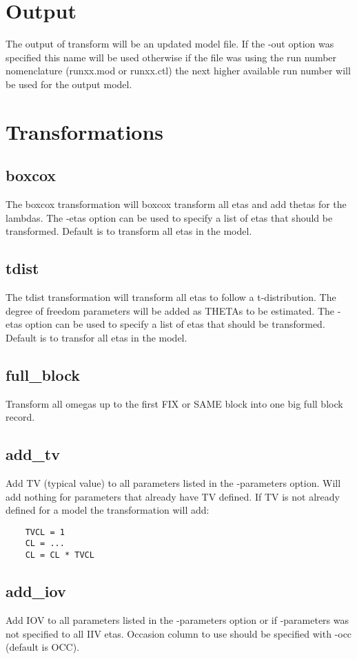 \section{Output}

The output of transform will be an updated model file. If the -out option was specified this name will be used otherwise if the file was using the run number nomenclature (runxx.mod or runxx.ctl) the next higher available run number will be used for the output model.

\section{Transformations}

\subsection{boxcox}
The boxcox transformation will boxcox transform all etas and add thetas for the lambdas. The -etas option can be used to specify a list of etas that should be transformed. Default is to transform all etas in the model.

\subsection{tdist}
The tdist transformation will transform all etas to follow a t-distribution. The degree of freedom parameters will be added as THETAs to be estimated. The -etas option can be used to specify a list of etas that should be transformed. Default is to transfor all etas in the model.

\subsection{full\_block}
Transform all omegas up to the first FIX or SAME block into one big full block record.

\subsection{add\_tv}
Add TV (typical value) to all parameters listed in the -parameters option. Will add nothing for parameters that already have TV defined. If TV is not already defined for a model the transformation will add:
\begin{verbatim}
    TVCL = 1
    CL = ...
    CL = CL * TVCL
\end{verbatim}

\subsection{add\_iov}
Add IOV to all parameters listed in the -parameters option or if -parameters was not specified to all IIV etas. Occasion column to use should be specified with -occ (default is OCC).

